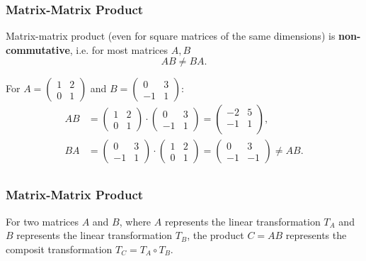 \begin{frame}
  \frametitle{Matrix-Matrix Product}
  Matrix-matrix product (even for square matrices of the same dimensions) is \textbf{non-commutative}, i.e. for most matrices $A,B$
  \begin{equation*}
    AB \neq BA.
  \end{equation*}

  \begin{presentation_example}
    For $A=\begin{pmatrix} 1 & 2 \\ 0 & 1 \end{pmatrix}$ and $B=\begin{pmatrix} 0 & 3 \\ -1 & 1 \end{pmatrix}$:
    \begin{align*}
      AB &= \begin{pmatrix} 1 & 2 \\ 0 & 1 \end{pmatrix} \cdot \begin{pmatrix} 0 & 3 \\ -1 & 1 \end{pmatrix} = \begin{pmatrix} -2&5 \\ -1&1 \\\end{pmatrix},\\
      BA &=  \begin{pmatrix} 0 & 3 \\ -1 & 1 \end{pmatrix} \cdot \begin{pmatrix} 1 & 2 \\ 0 & 1 \end{pmatrix} = \begin{pmatrix} 0&3 \\ -1&-1 \end{pmatrix} \neq AB.\\
    \end{align*}
  \end{presentation_example}
\end{frame}

\begin{frame}
  \frametitle{Matrix-Matrix Product}
  For two matrices $A$ and $B$, where $A$ represents the linear transformation $T_{A}$ and $B$ represents the linear transformation $T_{B}$, the product $C=AB$ represents the composit transformation $T_{C}=T_{A}\circ T_{B}$.
\end{frame}

